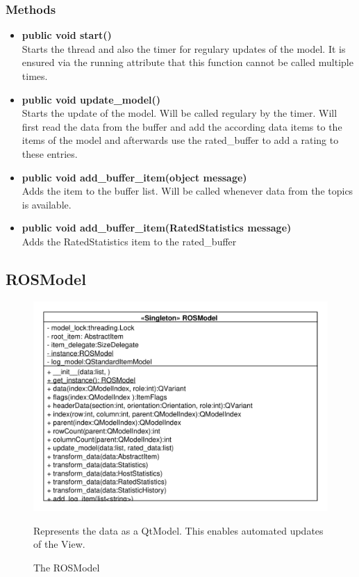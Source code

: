 \subsubsection{Methods}
\begin{itemize}
  \item \textbf{public void start()}\\
  Starts the thread and also the timer for regulary updates of the model. It is ensured via the running attribute that this function cannot be called multiple times.
  \item \textbf{public void update\_model()}\\ 
  Starts the update of the model. Will be called regulary by the timer. Will first read the data from the buffer and add the according data items to the items of the model and afterwards use the rated\_buffer to add a rating to these entries.
  \item \textbf{public void add\_buffer\_item(object message)}\\ 
  Adds the item to the buffer list. Will be called whenever data from the topics
  is available.
  \item \textbf{public void add\_buffer\_item(RatedStatistics message)}\\
  Adds the RatedStatistics item to the rated\_buffer
\end{itemize}

\subsection{ROSModel}
\begin{figure}[htbp]
	\begin{minipage}[t]{7cm}
		\vspace{0pt}
		\centering
		\includegraphics[scale=0.6]{./diagram_pictures/ROSModel.pdf}
		\caption{The ROSModel}
	\end{minipage}
	\hfill
	\begin{minipage}[t]{6cm}
		\vspace{10pt}		
		Represents the data as a QtModel. This enables automated updates of the View.
	\end{minipage}
\end{figure}
